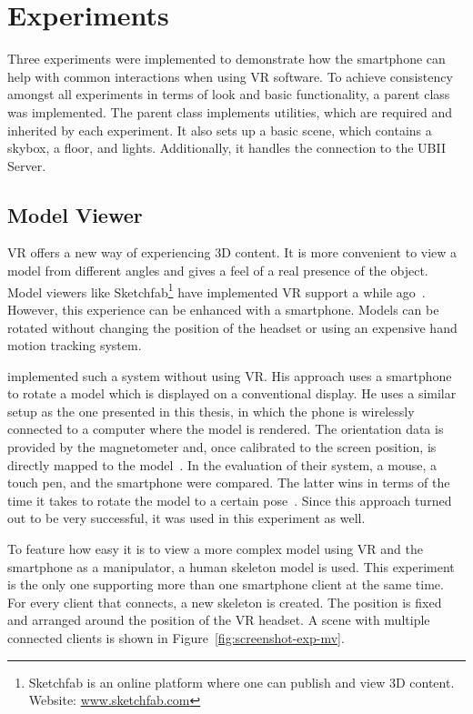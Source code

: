 \section{Experiments}\label{section:experiments}

Three experiments were implemented to demonstrate how the smartphone can help with common interactions when using \ac{VR} software.
To achieve consistency amongst all experiments in terms of look and basic functionality, a parent class was implemented. The parent class implements utilities, which are required and inherited by each experiment. It also sets up a basic scene, which contains a skybox, a floor, and lights. Additionally, it handles the connection to the \ac{UBII} Server. 


\subsection{Model Viewer}\label{subsection:model-viewer}

\acl{VR} offers a new way of experiencing \ac{3D} content. It is more convenient to view a model from different angles and gives a feel of a real presence of the object. Model viewers like Sketchfab\footnote{Sketchfab is an online platform where one can publish and view \ac{3D} content. Website: \href{https://sketchfab.com}{www.sketchfab.com}} have implemented \ac{VR} support a while ago~\cite{Denoyel.2016}. However, this experience can be enhanced with a smartphone. Models can be rotated without changing the position of the headset or using an expensive hand motion tracking system.

\citeauthor{Katzakis.2010} implemented such a system without using \ac{VR}. His approach uses a smartphone to rotate a model which is displayed on a conventional display. He uses a similar setup as the one presented in this thesis, in which the phone is wirelessly connected to a computer where the model is rendered. The orientation data is provided by the magnetometer and, once calibrated to the screen position, is directly mapped to the model~\cite[139]{Katzakis.2010}. In the evaluation of their system, a mouse, a touch pen, and the smartphone were compared. The latter wins in terms of the time it takes to rotate the model to a certain pose~\cite[140]{Katzakis.2010}. 
Since this approach turned out to be very successful, it was used in this experiment as well. 

To feature how easy it is to view a more complex model using VR and the smartphone as a manipulator, a human skeleton model is used. This experiment is the only one supporting more than one smartphone client at the same time. For every client that connects, a new skeleton is created. The position is fixed and arranged around the position of the \ac{VR} headset. A scene with multiple connected clients is shown in Figure~\ref{fig:screenshot-exp-mv}.

